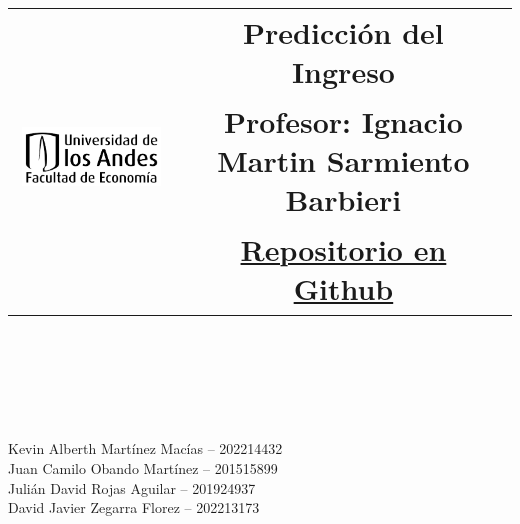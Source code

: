 \documentclass[12pt,a4paper,fleqn]{article}
\title{
\horrule{0.5pt} \\           %
\begin{table}[H]
	\centering
	\begin{tabular}{lc}
		\multirow{3}{*}{\includegraphics[scale=0.9]{Figuras/Andes.png}} & \textbf{Predicción del Ingreso}\\
		& \textbf{Profesor:} Ignacio Martin Sarmiento Barbieri \\
		& \href{https://github.com/pisco-rolo/PS_1_ML}{Repositorio en Github}
	\end{tabular}	
\end{table}
\horrule{2pt} \\ [0.5cm]            %
}
\author{}
\date{}
\begin{document}
    \maketitle
    \thispagestyle{empty}
    
    \vspace*{-3cm}
    
    \begin{flushright}
        Kevin Alberth Martínez Macías -- 202214432 \\
        Juan Camilo Obando Martínez -- 201515899\\
        Julián David Rojas Aguilar -- 201924937 \\
        David Javier Zegarra Florez -- 202213173 \\
    \end{flushright}
    
    

    
\end{document}
